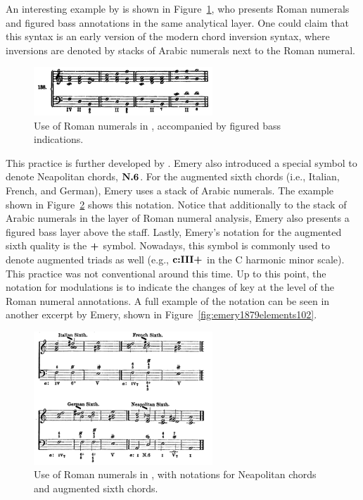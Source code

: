 An interesting example by \textcite{bussler1878praktische} is shown in Figure~\ref{fig:bussler1878praktische063}, who presents Roman numerals and figured bass annotations in the same analytical layer.
One could claim that this syntax is an early version of the modern chord inversion syntax, where inversions are denoted by stacks of Arabic numerals next to the Roman numeral.

\begin{figure}[h!]
    \centering
    \includegraphics[width=0.6\textwidth]{figures/chapter/2/primary_sources/bussler1878praktische063.png}
    \caption{Use of Roman numerals in \textcite{bussler1878praktische}, accompanied by figured bass indications.}
    \label{fig:bussler1878praktische063}
\end{figure}

This practice is further developed by \textcite{emery1879elements}.
Emery also introduced a special symbol to denote Neapolitan chords, $\textbf{N.6}\relax\relax$.
For the augmented sixth chords (i.e., Italian, French, and German), Emery uses a stack of Arabic numerals.
The example shown in Figure~\ref{fig:emery1879elements051} shows this notation.
Notice that additionally to the stack of Arabic numerals in the layer of Roman numeral analysis, Emery also presents a figured bass layer above the staff.
Lastly, Emery's notation for the augmented sixth quality is the $\textbf{+}\relax\relax$ symbol.
Nowadays, this symbol is commonly used to denote augmented triads as well (e.g., $\textbf{c:III+}\relax\relax$ in the C harmonic minor scale).
This practice was not conventional around this time.
Up to this point, the notation for modulations is to indicate the changes of key at the level of the Roman numeral annotations.
A full example of the notation can be seen in another excerpt by Emery, shown in Figure~\ref{fig:emery1879elements102}.

\begin{figure}[h!]
    \centering
    \includegraphics[width=0.6\textwidth]{figures/chapter/2/primary_sources/emery1879elements051.png}
    \caption{Use of Roman numerals in \textcite{emery1879elements}, with notations for Neapolitan chords and augmented sixth chords.}
    \label{fig:emery1879elements051}
\end{figure}

